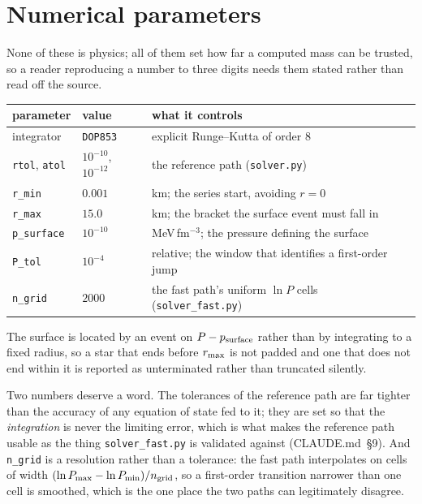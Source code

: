 \documentclass[aps,prc,onecolumn,superscriptaddress,nofootinbib,10pt]{revtex4-2}
\begin{document}
\section{Numerical parameters}
\label{sec:numerics}

None of these is physics; all of them set how far a computed mass can be
trusted, so a reader reproducing a number to three digits needs them stated
rather than read off the source.

\begin{center}
\begin{tabular}{lll}
\toprule
parameter & value & what it controls \\
\midrule
integrator & \texttt{DOP853} & explicit Runge--Kutta of order 8 \\
\texttt{rtol}, \texttt{atol} & $10^{-10}$, $10^{-12}$ & the reference path
  (\texttt{solver.py}) \\
\texttt{r\_min} & $0.001$ & km; the series start, avoiding $r = 0$ \\
\texttt{r\_max} & $15.0$ & km; the bracket the surface event must fall in \\
\texttt{p\_surface} & $10^{-10}$ & MeV\,fm$^{-3}$; the pressure defining the
  surface \\
\texttt{P\_tol} & $10^{-4}$ & relative; the window that identifies a
  first-order jump \\
\texttt{n\_grid} & $2000$ & the fast path's uniform $\ln P$ cells
  (\texttt{solver\_fast.py}) \\
\bottomrule
\end{tabular}
\end{center}

\noindent
The surface is located by an event on $P - p_{\rm surface}$ rather than by
integrating to a fixed radius, so a star that ends before $r_{\rm max}$ is not
padded and one that does not end within it is reported as unterminated rather
than truncated silently.

Two numbers deserve a word. The tolerances of the reference path are far
tighter than the accuracy of any equation of state fed to it; they are set so
that the \emph{integration} is never the limiting error, which is what makes
the reference path usable as the thing \texttt{solver\_fast.py} is validated
against (CLAUDE.md~\S9). And \texttt{n\_grid} is a resolution rather than a
tolerance: the fast path interpolates on cells of width
$(\ln P_{\max} - \ln P_{\min})/n_{\rm grid}$, so a first-order transition
narrower than one cell is smoothed, which is the one place the two paths can
legitimately disagree.
\end{document}
